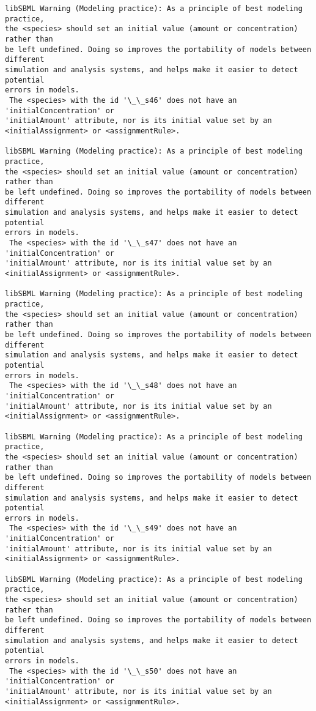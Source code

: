 \documentclass[11pt]{article}
\begin{document}
\begin{Verbatim}[commandchars=\\\{\}]
libSBML Warning (Modeling practice): As a principle of best modeling practice,
the <species> should set an initial value (amount or concentration) rather than
be left undefined. Doing so improves the portability of models between different
simulation and analysis systems, and helps make it easier to detect potential
errors in models.
 The <species> with the id '\_\_s46' does not have an 'initialConcentration' or
'initialAmount' attribute, nor is its initial value set by an
<initialAssignment> or <assignmentRule>.

libSBML Warning (Modeling practice): As a principle of best modeling practice,
the <species> should set an initial value (amount or concentration) rather than
be left undefined. Doing so improves the portability of models between different
simulation and analysis systems, and helps make it easier to detect potential
errors in models.
 The <species> with the id '\_\_s47' does not have an 'initialConcentration' or
'initialAmount' attribute, nor is its initial value set by an
<initialAssignment> or <assignmentRule>.

libSBML Warning (Modeling practice): As a principle of best modeling practice,
the <species> should set an initial value (amount or concentration) rather than
be left undefined. Doing so improves the portability of models between different
simulation and analysis systems, and helps make it easier to detect potential
errors in models.
 The <species> with the id '\_\_s48' does not have an 'initialConcentration' or
'initialAmount' attribute, nor is its initial value set by an
<initialAssignment> or <assignmentRule>.

libSBML Warning (Modeling practice): As a principle of best modeling practice,
the <species> should set an initial value (amount or concentration) rather than
be left undefined. Doing so improves the portability of models between different
simulation and analysis systems, and helps make it easier to detect potential
errors in models.
 The <species> with the id '\_\_s49' does not have an 'initialConcentration' or
'initialAmount' attribute, nor is its initial value set by an
<initialAssignment> or <assignmentRule>.

libSBML Warning (Modeling practice): As a principle of best modeling practice,
the <species> should set an initial value (amount or concentration) rather than
be left undefined. Doing so improves the portability of models between different
simulation and analysis systems, and helps make it easier to detect potential
errors in models.
 The <species> with the id '\_\_s50' does not have an 'initialConcentration' or
'initialAmount' attribute, nor is its initial value set by an
<initialAssignment> or <assignmentRule>.


\end{Verbatim}
\end{document}
